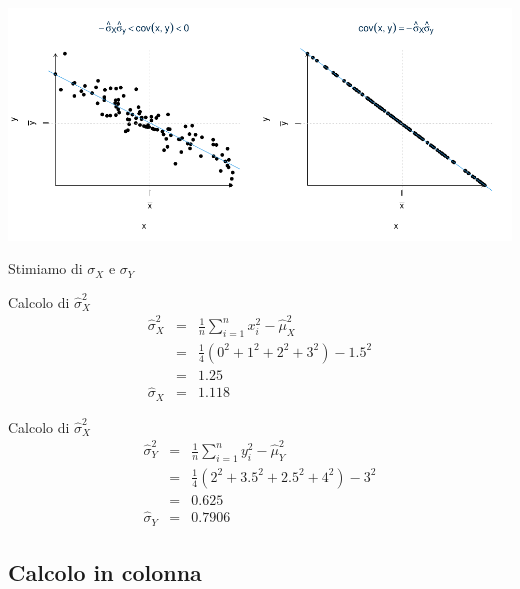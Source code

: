 \documentclass[
  11pt,
]{book}
\theoremstyle{mytheoremstyle}
\theoremstyle{mydefstyle}
\begin{document}
\begin{center}\includegraphics{Appunti_di_Statistica_2025_files/figure-latex/17-regressione-I-37-1} \end{center}

Stimiamo di \(\sigma_X\) e \(\sigma_Y\)

Calcolo di \(\hat\sigma_X^2\)
\begin{eqnarray*}
\hat\sigma_X^2&=&\frac 1 n\sum_{i=1}^n x_i^2-\hat\mu_X^2\\
&=&\frac 1 {4}(0^2+1^2+2^2+3^2)-1.5^2\\
&=&1.25\\
\hat\sigma_X &=& 1.118
\end{eqnarray*}

Calcolo di \(\hat\sigma_X^2\)
\begin{eqnarray*}
\hat\sigma_Y^2&=&\frac 1 n\sum_{i=1}^n y_i^2-\hat\mu_Y^2\\
&=&\frac 1 {4}(2^2+3.5^2+2.5^2+4^2)-3^2\\
&=&0.625\\
\hat\sigma_Y &=& 0.7906
\end{eqnarray*}

\subsection{Calcolo in colonna}\label{calcolo-in-colonna}
\end{document}
